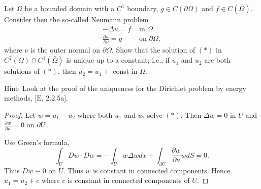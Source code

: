 \begin{problem}
	Let $\Omega$ be a bounded domain with a $C^1$ boundary, $g \in C(\partial \Omega)$ and $f \in C(\bar{\Omega})$. Consider then the so-called Neumann problem
\[
\begin{aligned}
-\Delta u=f & \text { in } \Omega \\
\frac{\partial u}{\partial \nu}=g & \text { on } \partial \Omega,
\end{aligned}
\]
where $\nu$ is the outer normal on $\partial \Omega$. Show that the solution of $(*)$ in $C^2(\Omega) \cap C^1(\bar{\Omega})$ is unique up to a constant; i.e., if $u_1$ and $u_2$ are both solutions of $(*)$, then $u_2=u_1+$ const in $\Omega$.

Hint: Look at the proof of the uniqueness for the Dirichlet problem by energy methods, $[\mathrm{E}$, 2.2.5a].
\end{problem}
\begin{proof}
	Let $w = u_1 - u_2$ where both $u_1$ and $u_2$ solve $(*)$. Then $\Delta w = 0$ in $U$ and $\frac{\partial w}{\partial \nu}  = 0$ on $\partial U$.

	Use Green's formula,
	\[
		\int _U Dw \cdot Dw = - \int _U w \Delta w dx + \int _{\partial U}\frac{\partial w}{\partial \nu} w dS = 0
	.\] 
	Thus $D w \equiv 0$ on $U$. Thus $w$ is constant in connected components. Hence $u_1 = u_2 + c$ where $c$ is constant in connected components of $U$.
\end{proof}

